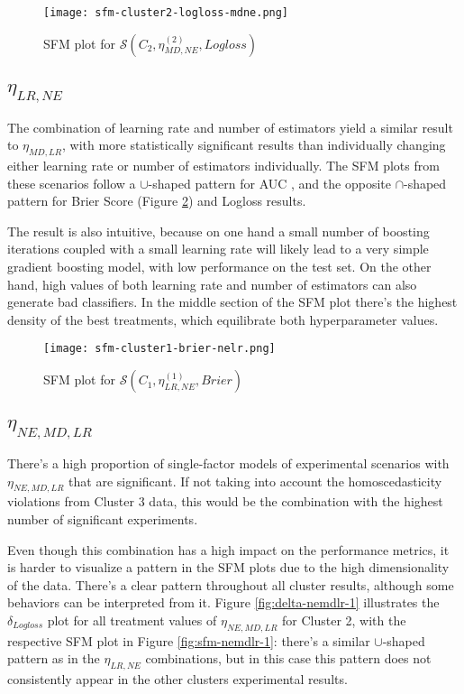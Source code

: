 \begin{figure}[H]
    \centering
    \texttt{[image: sfm-cluster2-logloss-mdne.png]}
    \caption{SFM plot for $\mathcal{S}(C_2, \eta^{(2)}_{MD, NE}, Logloss)$}
    \label{fig:sfm-mdne-1}
\end{figure}

\subsection{\texorpdfstring{\Large$\eta_{LR, NE}$}{}}

The combination of learning rate and number of estimators yield a similar result to $\eta_{MD, LR}$, with more statistically significant results than individually changing either learning rate or number of estimators individually. The SFM plots from these scenarios follow a $\cup$-shaped pattern for AUC , and the opposite $\cap$-shaped pattern for Brier Score (Figure \ref{fig:sfm-lrne-1}) and Logloss results.

The result is also intuitive, because on one hand a small number of boosting iterations coupled with a small learning rate will likely lead to a very simple gradient boosting model, with low performance on the test set. On the other hand, high values of both learning rate and number of estimators can also generate bad classifiers. In the middle section of the SFM plot there's the highest density of the best treatments, which equilibrate both hyperparameter values.

\begin{figure}[H]
    \centering
    \texttt{[image: sfm-cluster1-brier-nelr.png]}
    \caption{SFM plot for $\mathcal{S}(C_1, \eta^{(1)}_{LR, NE}, Brier)$}
    \label{fig:sfm-lrne-1}
\end{figure}

\subsection{\texorpdfstring{\Large$\eta_{NE, MD, LR}$}{}}

There's a high proportion of single-factor models of experimental scenarios with $\eta_{NE, MD, LR}$ that are significant. If not taking into account the homoscedasticity violations from Cluster 3 data, this would be the combination with the highest number of significant experiments.

Even though this combination has a high impact on the performance metrics, it is harder to visualize a pattern in the SFM plots due to the high dimensionality of the data. There's a clear pattern throughout all cluster results, although some behaviors can be interpreted from it. Figure \ref{fig:delta-nemdlr-1} illustrates the $\delta_{Logloss}$ plot for all treatment values of $\eta_{NE, MD, LR}$ for Cluster 2, with the respective SFM plot in Figure \ref{fig:sfm-nemdlr-1}: there's a similar $\cup$-shaped pattern as in the $\eta_{LR, NE}$ combinations, but in this case this pattern does not consistently appear in the other clusters experimental results.

